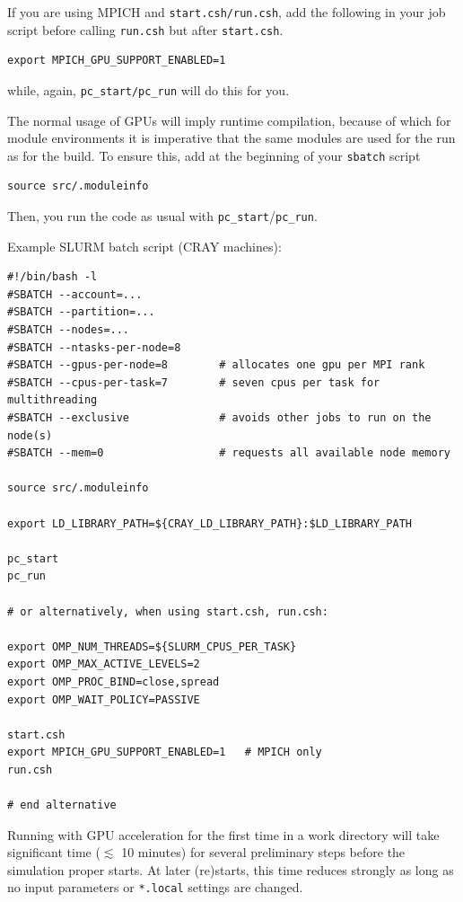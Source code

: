 \documentclass[a4paper,12pt]{article}
\newcommand{\command}[1]{\texttt{#1}}
\newcommand{\code}[1]{\texttt{#1}}
\begin{document}
If you are using MPICH and \command{start.csh/run.csh}, add the following in your job script before calling \command{run.csh} but after \command{start.csh}.
\begin{verbatim}
export MPICH_GPU_SUPPORT_ENABLED=1
\end{verbatim}
while, again, \code{pc_start/pc_run} will do this for you.

The normal usage of GPUs will imply runtime compilation, 
because of which for module environments it is imperative that the same modules are used for the run as for the build.
To ensure this, add at the beginning of your \code{sbatch} script
\begin{verbatim}
source src/.moduleinfo
\end{verbatim}
Then, you run the code as usual with \command{pc\_start}/\command{pc\_run}. 

Example SLURM batch script (CRAY machines):
\begin{verbatim}
#!/bin/bash -l
#SBATCH --account=...
#SBATCH --partition=...
#SBATCH --nodes=...
#SBATCH --ntasks-per-node=8
#SBATCH --gpus-per-node=8        # allocates one gpu per MPI rank 
#SBATCH --cpus-per-task=7        # seven cpus per task for multithreading
#SBATCH --exclusive              # avoids other jobs to run on the node(s)
#SBATCH --mem=0                  # requests all available node memory

source src/.moduleinfo

export LD_LIBRARY_PATH=${CRAY_LD_LIBRARY_PATH}:$LD_LIBRARY_PATH

pc_start
pc_run

# or alternatively, when using start.csh, run.csh:

export OMP_NUM_THREADS=${SLURM_CPUS_PER_TASK}
export OMP_MAX_ACTIVE_LEVELS=2
export OMP_PROC_BIND=close,spread
export OMP_WAIT_POLICY=PASSIVE

start.csh
export MPICH_GPU_SUPPORT_ENABLED=1   # MPICH only
run.csh

# end alternative

\end{verbatim}

Running with GPU acceleration for the first time in a work directory will take significant time ($\lesssim$ 10 minutes) for several preliminary steps before the simulation proper starts. At later (re)starts, this time reduces strongly as long as no input parameters or \command{*.local} settings are changed.
\end{document}
